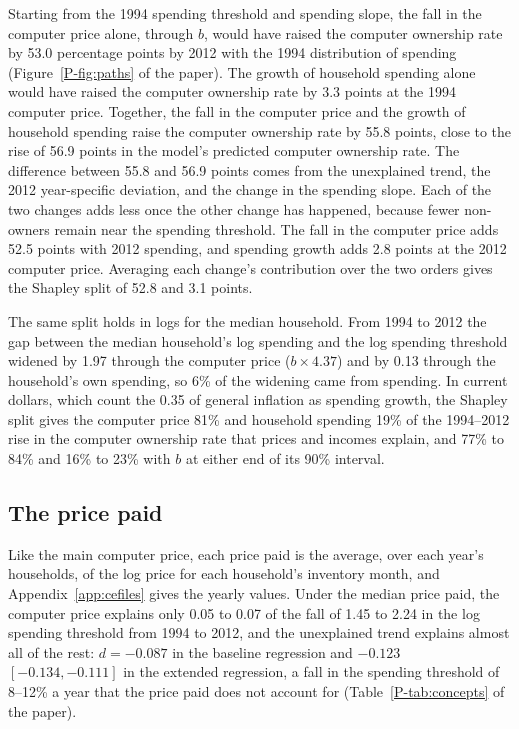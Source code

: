 \documentclass[11pt]{article}
\begin{document}
Starting from the 1994 spending threshold and spending slope, the fall in the computer price alone, through $b$, would have raised the computer ownership rate by 53.0 percentage points by 2012 with the 1994 distribution of spending (Figure~\ref{P-fig:paths} of the paper). The growth of household spending alone would have raised the computer ownership rate by 3.3 points at the 1994 computer price. Together, the fall in the computer price and the growth of household spending raise the computer ownership rate by 55.8 points, close to the rise of 56.9 points in the model's predicted computer ownership rate. The difference between 55.8 and 56.9 points comes from the unexplained trend, the 2012 year-specific deviation, and the change in the spending slope. Each of the two changes adds less once the other change has happened, because fewer non-owners remain near the spending threshold. The fall in the computer price adds 52.5 points with 2012 spending, and spending growth adds 2.8 points at the 2012 computer price. Averaging each change's contribution over the two orders gives the Shapley split of 52.8 and 3.1 points.

The same split holds in logs for the median household. From 1994 to 2012 the gap between the median household's log spending and the log spending threshold widened by 1.97 through the computer price ($b \times 4.37$) and by 0.13 through the household's own spending, so 6\% of the widening came from spending. In current dollars, which count the 0.35 of general inflation as spending growth, the Shapley split gives the computer price 81\% and household spending 19\% of the 1994--2012 rise in the computer ownership rate that prices and incomes explain, and 77\% to 84\% and 16\% to 23\% with $b$ at either end of its 90\% interval.

\subsection{The price paid}
\label{app:pricepaid}

Like the main computer price, each price paid is the average, over each year's households, of the log price for each household's inventory month, and Appendix~\ref{app:cefiles} gives the yearly values. Under the median price paid, the computer price explains only 0.05 to 0.07 of the fall of 1.45 to 2.24 in the log spending threshold from 1994 to 2012, and the unexplained trend explains almost all of the rest: $d = -0.087$ in the baseline regression and $-0.123$ $[-0.134, -0.111]$ in the extended regression, a fall in the spending threshold of 8--12\% a year that the price paid does not account for (Table~\ref{P-tab:concepts} of the paper).
\end{document}
